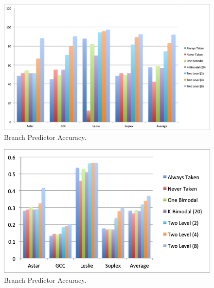 \documentclass[9pt]{article}
\begin{document}
\begin{figure}[t]
  \centering
  \includegraphics[height=.45\textheight]{accuracy.png}
  \caption{Branch Predictor Accuracy.}
\end{figure}

\begin{figure}[t]
  \centering
  \includegraphics[height=.45\textheight]{ipc.png}
  \caption{Branch Predictor Accuracy.}
\end{figure}
\end{document}
